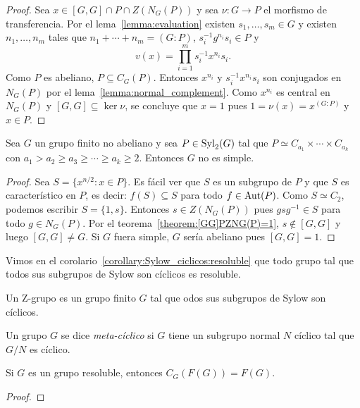 \begin{proof}
	Sea $x\in [G,G]\cap P\cap Z(N_G(P))$ y sea $\nu\colon G\to P$ el morfismo
	de transferencia.  Por el lema~\ref{lemma:evaluation} existen
	$s_1,\dots,s_m\in G$ y existen $n_1,\dots,n_m$ tales que
	$n_1+\cdots+n_m=(G:P)$, $s_i^{-1}g^{n_i}s_i\in P$ y 
	\[
		v(x)=\prod_{i=1}^m s_i^{-1}x^{n_i}s_i.
	\]
	Como $P$ es abeliano, $P\subseteq C_G(P)$. Entonces $x^{n_i}$ y
	$s_i^{-1}x^{n_i}s_i$ son conjugados en $N_G(P)$ por el
	lema~\ref{lemma:normal_complement}. Como $x^{n_i}$ es central en $N_G(P)$ y
	$[G,G]\subseteq\ker\nu$, se concluye que $x=1$ pues $1=\nu(x)=x^{(G:P)}$ y
	$x\in P$.
\end{proof}

\begin{corollary}
	Sea $G$ un grupo finito no abeliano y sea $P\in\mathrm{Syl}_2(G)$ tal que $P\simeq
	C_{a_1}\times\cdots\times C_{a_k}$ con $a_1>a_2\geq a_3\geq\cdots\geq
	a_k\geq 2$.  Entonces $G$ no es simple. 
\end{corollary}

\begin{proof}
	Sea $S=\{x^{n/2}:x\in P\}$. Es fácil ver que $S$ es un subgrupo de $P$ y
	que $S$ es característico en $P$, es decir: $f(S)\subseteq S$ para todo
	$f\in\operatorname{Aut}(P)$. Como $S\simeq C_2$, podemos escribir $S=\{1,s\}$. Entonces
	$s\in Z(N_G(P))$ pues $gsg^{-1}\in S$ para todo $g\in N_G(P)$. Por el
	teorema~\ref{theorem:[GG]PZNG(P)=1}, $s\not\in[G,G]$ y luego $[G,G]\ne G$.
	Si $G$ fuera simple, $G$ sería abeliano pues $[G,G]=1$.
\end{proof}

Vimos en el corolario~\ref{corollary:Sylow_ciclicos:resoluble} que todo grupo
tal que todos sus subgrupos de Sylow son cíclicos es resoluble.

\begin{definition}
	Un Z-grupo es un grupo finito $G$ tal que 
	odos sus subgrupos de Sylow son
	cíclicos.
\end{definition}

Un grupo $G$ se dice \emph{meta-cíclico} si $G$ tiene un subgrupo normal $N$
cíclico tal que $G/N$ es cíclico.

\begin{lemma}
	Si $G$ es un grupo resoluble, entonces $C_G(F(G))=F(G)$.
\end{lemma}

\begin{proof}
	
\end{proof}

